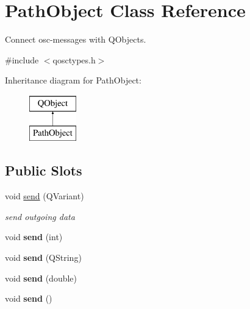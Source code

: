 \hypertarget{class_path_object}{}\section{Path\+Object Class Reference}
\label{class_path_object}


Connect osc-\/messages with Q\+Objects.  




{\ttfamily \#include $<$qosctypes.\+h$>$}

Inheritance diagram for Path\+Object\+:\begin{figure}[H]
\begin{center}
\leavevmode
\includegraphics[height=2.000000cm]{class_path_object}
\end{center}
\end{figure}
\subsection*{Public Slots}
\textbf{ }\par
\begin{DoxyCompactItemize}
\item 
\mbox{\label{class_path_object_a4371ed0b0d1fca7a2a6f7e8a17c9b8ab}} 
void \hyperlink{class_path_object_a4371ed0b0d1fca7a2a6f7e8a17c9b8ab}{send} (Q\+Variant)
\begin{DoxyCompactList}\small\item\em send outgoing data \end{DoxyCompactList}\item 
\mbox{\label{class_path_object_a8032c0afa1bcd2923d941731b18ebe68}} 
void {\bfseries send} (int)
\item 
\mbox{\label{class_path_object_aeb2da6fb2ad97a83f72bbb607d8d732d}} 
void {\bfseries send} (Q\+String)
\item 
\mbox{\label{class_path_object_a85e5cab89000448a4d5ffe200e5d13a2}} 
void {\bfseries send} (double)
\item 
\mbox{\label{class_path_object_ae3bf4f90cda5e6862cde01f6ff072f65}} 
void {\bfseries send} ()
\end{DoxyCompactItemize}

